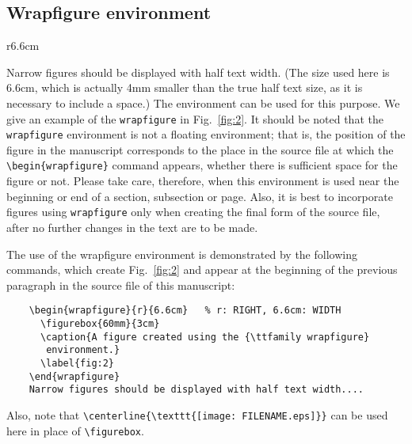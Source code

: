 \documentclass[seceq]{ptptex}
\def\boxenv#1{\fbox{\ttfamily  #1}}
\begin{document}
\subsection{Wrapfigure environment}

\begin{wrapfigure}{r}{6.6cm}
  \figurebox{60mm}{3cm}
\caption{A figure created using the {\ttfamily wrapfigure} environment.}
\label{fig:2}
\end{wrapfigure}
Narrow figures should be displayed with half text width. (The size
 used here is 6.6cm, which is actually 4mm smaller than the true
half text size, as it is necessary to include a space.)
The \boxenv{wrapfigure} environment can be used for this purpose. 
We give an example of the \verb+wrapfigure+ in Fig.~\ref{fig:2}. 
It should be noted that the \verb+wrapfigure+ environment is not a 
floating environment; that is, the position of the figure in the 
manuscript corresponds to the place in the source
file at which the \verb+\begin{wrapfigure}+ command appears, whether 
there is sufficient space for the figure or not.
Please take care, therefore, when this environment is used 
near the beginning or end of a section, subsection or page. Also,
it is best to incorporate figures using 
\verb+wrapfigure+ only when creating the final form of the source
file, after no further changes in the text are to be made. 

The use of the wrapfigure environment is demonstrated by the following 
commands, which create Fig.~\ref{fig:2} and appear at the beginning of 
the previous paragraph in the source file of this manuscript:
\begin{center}
\begin{verbatim}
    \begin{wrapfigure}{r}{6.6cm}   % r: RIGHT, 6.6cm: WIDTH  
      \figurebox{60mm}{3cm}
      \caption{A figure created using the {\ttfamily wrapfigure} 
       environment.}      
      \label{fig:2}
    \end{wrapfigure}
    Narrow figures should be displayed with half text width.... 
\end{verbatim}
\end{center}
Also, note that \verb+\centerline{\texttt{[image: FILENAME.eps]}}+ can 
be used here in place of \verb+\figurebox+.
\end{document}
